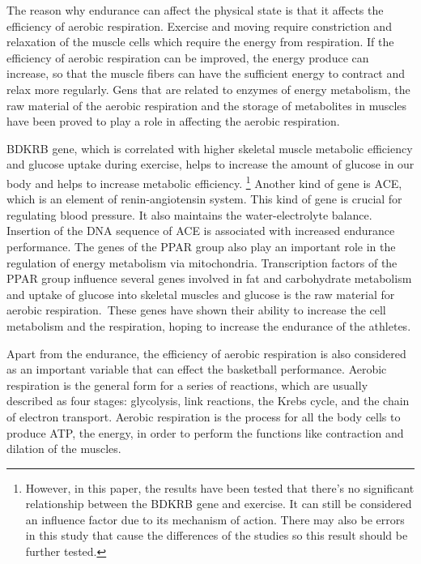 \documentclass[man,floatsintext]{apa7}
\begin{document}
The reason why endurance can affect the physical state is that it affects the efficiency of aerobic respiration.\autocite{forsmanh.KoripalloilijanFyysinenHarjoittelu2024} Exercise and moving require constriction and relaxation of the muscle cells which require the energy from respiration. If the efficiency of aerobic respiration can be improved, the energy produce can increase, so that the muscle fibers can have the sufficient energy to contract and relax more regularly. Gens that are related to enzymes of energy metabolism, the raw material of the aerobic respiration and the storage of metabolites in muscles have been proved to play a role in affecting the aerobic respiration.\autocite{ahmetovGenesAthleticPerformance2016}

BDKRB gene, which is correlated with higher skeletal muscle metabolic efficiency and glucose uptake during exercise, helps to increase the amount of glucose in our body and helps to increase metabolic efficiency.\autocite{mareksawczukPolymorphismBradykininReceptor2013} \footnote{However, in this paper, the results have been tested that there's no significant relationship between the BDKRB gene and exercise. It can still be considered an influence factor due to its mechanism of action. There may also be errors in this study that cause the differences of the studies so this result should be further tested.} Another kind of gene is ACE, which is an element of renin-angiotensin system. This kind of gene is crucial for regulating blood pressure. It also maintains the water-electrolyte balance.\autocite{loefflerBiochemieUndPathobiochemie2019} Insertion of the DNA sequence of ACE is associated with increased endurance performance. The genes of the PPAR group also play an important role in the regulation of energy metabolism via mitochondria. Transcription factors of the PPAR group influence several genes involved in fat and carbohydrate metabolism and uptake of glucose into skeletal muscles \autocite{loefflerBiochemieUndPathobiochemie2019} and glucose is the raw material for aerobic respiration. These genes have shown their ability to increase the cell metabolism and the respiration, hoping to increase the endurance of the athletes.

Apart from the endurance, the efficiency of aerobic respiration is also considered as an important variable that can effect the basketball performance. Aerobic respiration is the general form for a series of reactions, which are usually described as four stages: glycolysis, link reactions, the Krebs cycle, and the chain of electron transport. Aerobic respiration is the process for all the body cells to produce ATP, the energy, in order to perform the functions like contraction and dilation of the muscles. 
\end{document}
